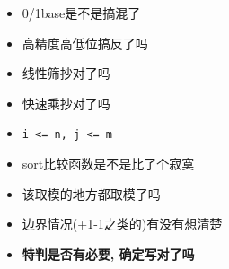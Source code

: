 \noindent
\begin{itemize}
    \item 0/1base是不是搞混了
    \item 高精度高低位搞反了吗
    \item 线性筛抄对了吗
    \item 快速乘抄对了吗
    \item \texttt{i <= n, j <= m}
    \item sort比较函数是不是比了个寂寞
    \item 该取模的地方都取模了吗
    \item 边界情况(+1-1之类的)有没有想清楚
    \item \bfseries{特判是否有必要, 确定写对了吗}
\end{itemize}
